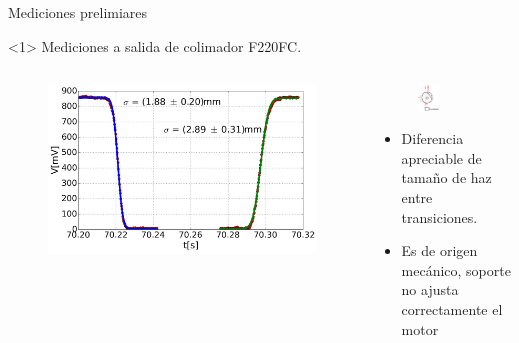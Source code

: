     \begin{frame}{Mediciones prelimiares}
        \begin{onlyenv}<1>
        Mediciones a salida de colimador F220FC.
        \begin{columns}[c]
            \begin{column}{0.6\textwidth}
                 \begin{figure}
                    \includegraphics[width=\textwidth]{fig/perfilador/fit_data_labo6}
                    \label{fig:perfilador/fit_data_labo6}
                \end{figure} 
                
               
            \end{column}

            \begin{column}{0.4\textwidth}
                 \begin{figure}
                    \includegraphics[width=0.4\textwidth]{fig/perfilador/corte_tambor}
                    \label{fig:perfilador/corte_tambor}
                \end{figure} 
                \begin{itemize}
                    \item Diferencia apreciable de tamaño de haz entre transiciones.
                    \item Es de origen mecánico, soporte no ajusta correctamente el motor
                \end{itemize}
            \end{column}
        \end{columns}
        

\end{onlyenv}
\end{frame}

